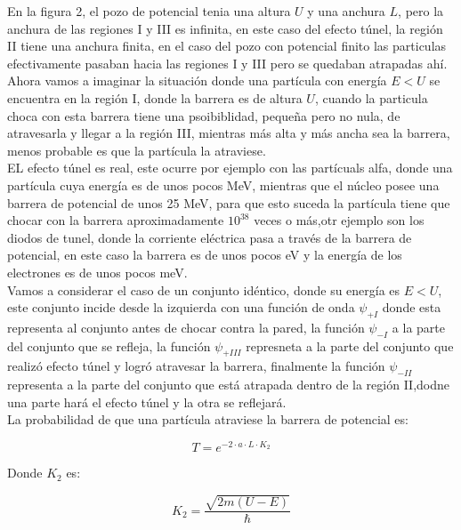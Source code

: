 \documentclass[a4paper]{article}
\begin{document}
            \indent En la figura 2, el pozo de potencial tenia una altura $U$ y una anchura $L$, pero la anchura de las regiones I y III es infinita, en este caso del efecto túnel, la región II tiene una anchura finita, en el caso del pozo con potencial finito las particulas efectivamente pasaban hacia las regiones I y III pero se quedaban atrapadas ahí.\\
            \indent Ahora vamos a imaginar la situación donde una partícula con energía $E < U$ se encuentra en la región I, donde la barrera es de altura $U$, cuando la particula choca con esta barrera tiene una psoibiblidad, pequeña pero no nula, de atravesarla y llegar a la región III, mientras más alta y más ancha sea la barrera, menos probable es que la partícula la atraviese.\\
            \indent EL efecto túnel es real, este ocurre por ejemplo con las partícuals alfa, donde una partícula cuya energía es de unos pocos MeV, mientras que el núcleo posee una barrera de potencial de unos 25 MeV, para que esto suceda la partícula tiene que chocar con la barrera aproximadamente $10^{38}$ veces o más,otr ejemplo son los diodos de tunel, donde la corriente eléctrica pasa a través de la barrera de potencial, en este caso la barrera es de unos pocos eV y la energía de los electrones es de unos pocos meV.\\
            \indent Vamos a considerar el caso de un conjunto idéntico, donde su energía es $E < U$, este conjunto incide desde la izquierda con una función de onda $\psi_{+I}$ donde esta representa al conjunto antes de chocar contra la pared, la función $\psi_{-I}$ a la parte del conjunto que se refleja, la función $\psi_{+III}$ represneta a la parte del conjunto que realizó efecto túnel y logró atravesar la barrera, finalmente la función $\psi_{-II}$ representa a la parte del conjunto que está atrapada dentro de la región II,dodne una parte hará el efecto túnel y la otra se reflejará.\\

            \indent La probabilidad de que una partícula atraviese la barrera de potencial es:

            \begin{equation}
                T = e^{-2 \cdot a \cdot L \cdot K_2}
            \end{equation}

            \indent Donde $K_2$ es:

            \begin{equation}
                K_2 = \frac{\sqrt{2m(U - E)}}{\hbar}
            \end{equation}
\end{document}
